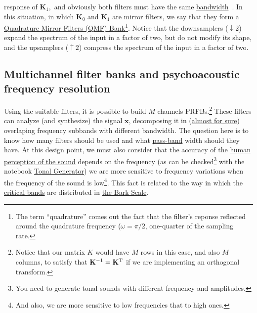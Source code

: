 response of ${\mathbf K}_1,$ and obviously both filters must have the
same
\href{https://en.wikipedia.org/wiki/Bandwidth_(signal_processing)}{bandwidth}~\cite{sayood2017introduction}. In
this situation, in which ${\mathbf K}_0$ and ${\mathbf K}_1$ are
mirror filters, we say that they form a
\href{https://en.wikipedia.org/wiki/Quadrature_mirror_filter}{Quadrature
  Mirror Filters (QMF) Bank}\footnote{The term ``quadrature'' comes
out the fact that the filter's reponse reflected around the quadrature
frequency ($\omega=\pi/2$, one-quarter of the sampling rate.}. Notice
that the downsamplers ($\downarrow 2$) expand the spectrum of the
input in a factor of two, but do not modify its shape, and the
upsamplers ($\uparrow 2$) compress the spectrum of the input in a
factor of two.


\subsection{Multichannel filter banks and psychoacoustic frequency resolution}

Using the suitable filters, it is possible to build $M$-channels
PRFBs.\footnote{Notice that our matrix $K$ would have $M$ rows in this
  case, and also $M$ columns, to satisfy that
  ${\mathbf K}^{-1}={\mathbf K}^{\text T}$ if we are implementing an
  orthogonal transform.}  These filters can analyze (and synthesize)
the signal ${\mathbf x}$, decomposing it in
(\href{https://en.wikipedia.org/wiki/Low-pass_filter#Ideal_and_real_filters}{almost
  for sure}) overlaping frequency subbands with different
bandwidth. The question here is to know how many filters should be
used and what
\href{https://en.wikipedia.org/wiki/Band-pass_filter}{pass-band} width
should they have. At this design point, we must also consider that the
accuracy of the
\href{https://en.wikipedia.org/wiki/Psychoacoustics}{human perception
  of the sound} depends on the frequency (as can be
checked\footnote{You need to generate tonal sounds with different
  frequency and amplitudes.} with the notebook
\href{https://github.com/Tecnologias-multimedia/InterCom/blob/master/tools/tonal_generator.ipynb}{Tonal
  Generator}) we are more sensitive to frequency variations when the
frequency of the sound is low\footnote{And also, we are more sensitive
  to low frequencies that to high ones.}. This fact is related to
the way in which the
\href{https://en.wikipedia.org/wiki/Critical_band}{critical bands} are
distributed in \href{https://en.wikipedia.org/wiki/Bark_scale}{the
  Bark Scale}.

